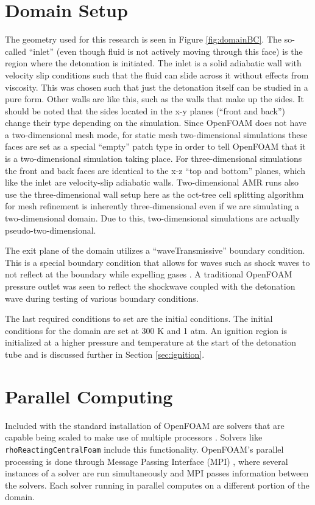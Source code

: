 \section{Domain Setup}
The geometry used for this research is seen in Figure \ref{fig:domainBC}. The so-called ``inlet'' (even though fluid is not actively moving through this face) is the region where the detonation is initiated. The inlet is a solid adiabatic wall with velocity slip conditions such that the fluid can slide across it without effects from viscosity. This was chosen such that just the detonation itself can be studied in a pure form. Other walls are like this, such as the walls that make up the sides. It should be noted that the sides located in the x-y planes (``front and back'') change their type depending on the simulation. Since OpenFOAM does not have a two-dimensional mesh mode, for static mesh two-dimensional simulations these faces are set as a special ``empty'' patch type in order to tell OpenFOAM that it is a two-dimensional simulation taking place. For three-dimensional simulations the front and back faces are identical to the x-z ``top and bottom'' planes, which like the inlet are velocity-slip adiabatic walls. Two-dimensional AMR runs also use the three-dimensional wall setup here as the oct-tree cell splitting algorithm for mesh refinement is inherently three-dimensional even if we are simulating a two-dimensional domain. Due to this, two-dimensional simulations are actually pseudo-two-dimensional. 

The exit plane of the domain utilizes a ``waveTransmissive'' boundary condition. This is a special boundary condition that allows for waves such as shock waves to not reflect at the boundary while expelling gases \cite{poinsot}. A traditional OpenFOAM pressure outlet was seen to reflect the shockwave coupled with the detonation wave during testing of various boundary conditions. 

The last required conditions to set are the initial conditions. The initial conditions for the domain are set at 300 K and 1 atm. An ignition region is initialized at a higher pressure and temperature at the start of the detonation tube and is discussed further in Section \ref{sec:ignition}.




\section{Parallel Computing}
Included with the standard installation of OpenFOAM are solvers that are capable being scaled to make use of multiple processors \cite{ofug}. Solvers like \verb|rhoReactingCentralFoam| include this functionality. OpenFOAM's parallel processing is done through Message Passing Interface (MPI) \cite{walker}, where several instances of a solver are run simultaneously and MPI passes information between the solvers. Each solver running in parallel computes on a different portion of the domain. 

